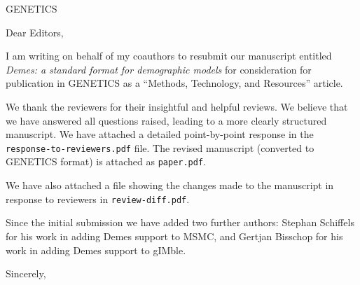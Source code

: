 \documentclass{letter}
\begin{document}
\begin{letter}{GENETICS}

\opening{Dear Editors,}

I am writing on behalf of my coauthors to resubmit our manuscript entitled
\emph{Demes: a standard format for demographic models}
for consideration for publication in GENETICS
as a ``Methods, Technology, and Resources'' article.

We thank the reviewers for their insightful and helpful reviews. We
believe that we have answered all questions raised, leading to a more
clearly structured manuscript. We have attached
a detailed point-by-point response in the \texttt{response-to-reviewers.pdf}
file. The revised manuscript (converted to GENETICS format) is
attached as \texttt{paper.pdf}.

We have also attached a file showing the changes made to the manuscript
in response to reviewers in \texttt{review-diff.pdf}.

Since the initial submission we have added two further authors:
Stephan Schiffels
for his work in adding Demes support
to MSMC, and Gertjan Bisschop for his work in adding
Demes support to gIMble.

\closing{Sincerely,}

\end{letter}
\end{document}
